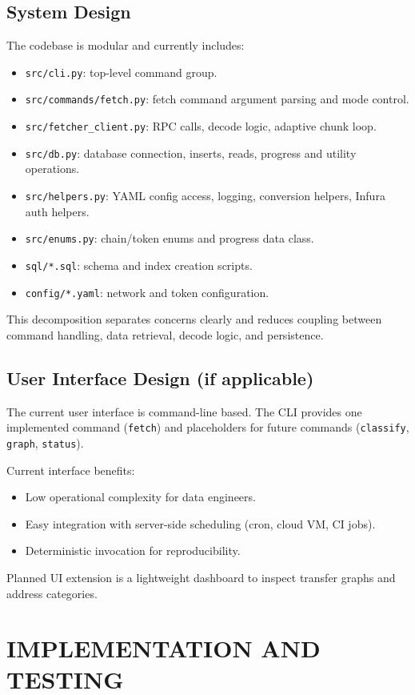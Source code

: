\documentclass[a4paper,12pt]{report}
\begin{document}
\section{System Design}
The codebase is modular and currently includes:
\begin{itemize}
\item \texttt{src/cli.py}: top-level command group.
\item \texttt{src/commands/fetch.py}: fetch command argument parsing and mode control.
\item \texttt{src/fetcher\_client.py}: RPC calls, decode logic, adaptive chunk loop.
\item \texttt{src/db.py}: database connection, inserts, reads, progress and utility operations.
\item \texttt{src/helpers.py}: YAML config access, logging, conversion helpers, Infura auth helpers.
\item \texttt{src/enums.py}: chain/token enums and progress data class.
\item \texttt{sql/*.sql}: schema and index creation scripts.
\item \texttt{config/*.yaml}: network and token configuration.
\end{itemize}

This decomposition separates concerns clearly and reduces coupling between command handling,
data retrieval, decode logic, and persistence.

\section{User Interface Design (if applicable)}
The current user interface is command-line based. The CLI provides one implemented command
(\texttt{fetch}) and placeholders for future commands (\texttt{classify}, \texttt{graph}, \texttt{status}).

Current interface benefits:
\begin{itemize}
\item Low operational complexity for data engineers.
\item Easy integration with server-side scheduling (cron, cloud VM, CI jobs).
\item Deterministic invocation for reproducibility.
\end{itemize}

Planned UI extension is a lightweight dashboard to inspect transfer graphs and address categories.

\chapter{IMPLEMENTATION AND TESTING}
\end{document}
